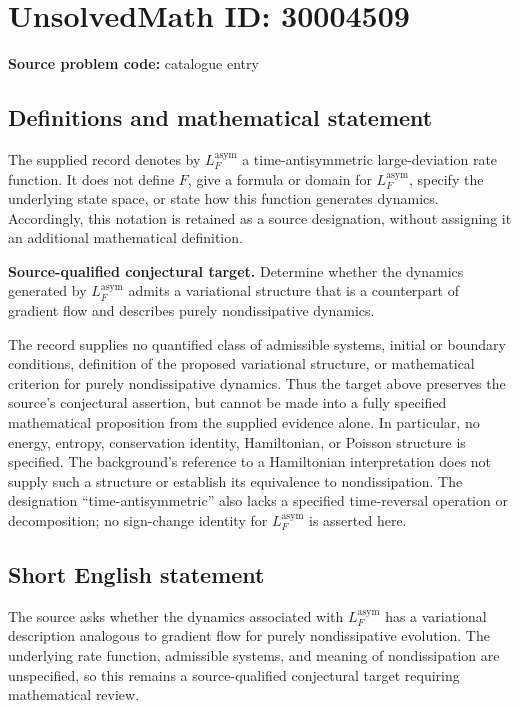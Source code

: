 \documentclass[11pt]{article}
\begin{document}
\section*{UnsolvedMath ID: 30004509}
\textbf{Source problem code:} catalogue entry
\subsection{Definitions and mathematical statement}
The supplied record denotes by \(L_F^{\mathrm{asym}}\) a time-antisymmetric large-deviation rate function. It does not define \(F\), give a formula or domain for \(L_F^{\mathrm{asym}}\), specify the underlying state space, or state how this function generates dynamics. Accordingly, this notation is retained as a source designation, without assigning it an additional mathematical definition.

\textbf{Source-qualified conjectural target.} Determine whether the dynamics generated by \(L_F^{\mathrm{asym}}\) admits a variational structure that is a counterpart of gradient flow and describes purely nondissipative dynamics.

The record supplies no quantified class of admissible systems, initial or boundary conditions, definition of the proposed variational structure, or mathematical criterion for purely nondissipative dynamics. Thus the target above preserves the source's conjectural assertion, but cannot be made into a fully specified mathematical proposition from the supplied evidence alone. In particular, no energy, entropy, conservation identity, Hamiltonian, or Poisson structure is specified. The background's reference to a Hamiltonian interpretation does not supply such a structure or establish its equivalence to nondissipation. The designation ``time-antisymmetric'' also lacks a specified time-reversal operation or decomposition; no sign-change identity for \(L_F^{\mathrm{asym}}\) is asserted here.
\subsection{Short English statement}
The source asks whether the dynamics associated with \(L_F^{\mathrm{asym}}\) has a variational description analogous to gradient flow for purely nondissipative evolution. The underlying rate function, admissible systems, and meaning of nondissipation are unspecified, so this remains a source-qualified conjectural target requiring mathematical review.
\end{document}
